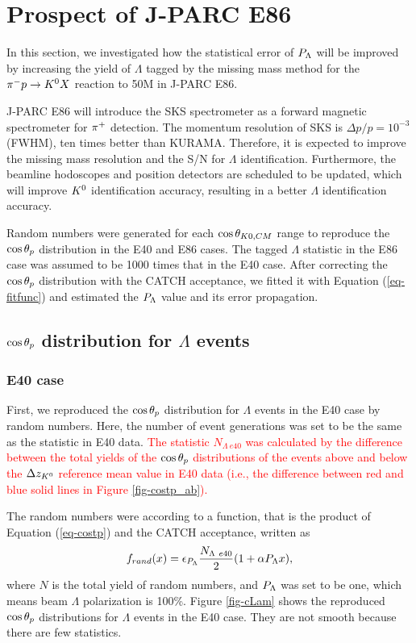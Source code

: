 \section{Prospect of J-PARC E86}
\label{sec-prospect}

In this section, we investigated how the statistical error of $P_{\Lambda}$ will be improved by increasing the yield of $\Lambda$ tagged by the missing mass method for the $\pi^- p \to K^0 X$ reaction to 50M in J-PARC E86. 

J-PARC E86 will introduce the SKS spectrometer \cite{K1.8} as a forward magnetic spectrometer for $\pi^{+}$ detection. The momentum resolution of SKS is $\Delta p/p=10^{-3}$ (FWHM), ten times better than KURAMA. Therefore, it is expected to improve the missing mass resolution and the S/N for $\Lambda$ identification. Furthermore, the beamline hodoscopes and position detectors are scheduled to be updated, which will improve $K^{0}$ identification accuracy, resulting in a better $\Lambda$ identification accuracy.

Random numbers were generated for each $\cos{\theta_{K0,CM}}$ range to reproduce the $\cos{\theta_p}$ distribution in the E40 and E86 cases. The tagged $\Lambda$ statistic in the E86 case was assumed to be 1000 times that in the E40 case. After correcting the $\cos{\theta_p}$ distribution with the CATCH acceptance, we fitted it with Equation (\ref{eq-fitfunc}) and estimated the $P_{\Lambda}$ value and its error propagation.


\clearpage
\subsection{$\cos{\theta_p}$ distribution for $\Lambda$ events}
\label{subsec-randcostpLam}
\subsubsection{E40 case}
First, we reproduced the $\cos{\theta_p}$ distribution for $\Lambda$ events in the E40 case by random numbers. Here, the number of event generations was set to be the same as the statistic in E40 data. \textcolor{red}{ The statistic $N_{\Lambda\ e40}$ was calculated by the difference between the total yields of the $\cos{\theta_p}$ distributions of the events above and below the $\Delta z_{K^{0}}$ reference mean value in E40 data (i.e., the difference between red and blue solid lines in Figure \ref{fig-costp_ab}). }

The random numbers were according to a function, that is the product of Equation (\ref{eq-costp}) and the CATCH acceptance, written as
\begin{equation}
  f_{rand}(x) = \epsilon_{P_{\Lambda}} \frac{N_{\Lambda\ e40}}{2}(1+\alpha P_{\Lambda} x),
  \label{eq-randfunc}
\end{equation}
where $N$ is the total yield of random numbers, and $P_{\Lambda}$ was set to be one, which means beam $\Lambda$ polarization is 100\%.  Figure \ref{fig-cLam} shows the reproduced $\cos{\theta_p}$ distributions for $\Lambda$ events in the E40 case. They are not smooth because there are few statistics.

